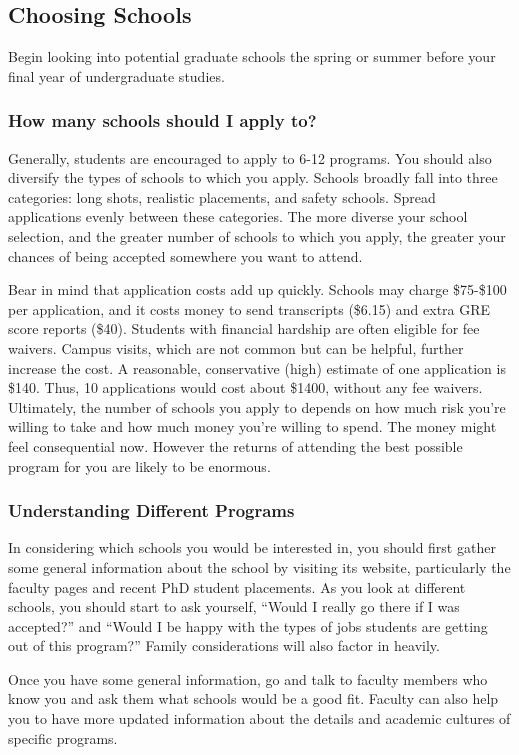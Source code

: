\documentclass[11pt]{article}
\begin{document}
\subsection{Choosing Schools}
Begin looking into potential graduate schools the spring or summer before your final year of undergraduate studies.

\subsubsection*{How many schools should I apply to?}
Generally, students are encouraged to apply to 6-12 programs. You should also diversify the types of schools to which you apply. Schools broadly fall into three categories: long shots, realistic placements, and safety schools. Spread applications evenly between these categories. The more diverse your school selection, and the greater number of schools to which you apply, the greater your chances of being accepted somewhere you want to attend.

Bear in mind that application costs add up quickly. Schools may charge \$75-\$100 per application, and it costs money to send transcripts (\$6.15) and extra GRE score reports (\$40). Students with financial hardship are often eligible for fee waivers. Campus visits, which are not common but can be helpful, further increase the cost. A reasonable, conservative (high) estimate of one application is \$140. Thus, 10 applications would cost about \$1400, without any fee waivers. Ultimately, the number of schools you apply to depends on how much risk you’re willing to take and how much money you’re willing to spend. The money might feel consequential now. However the returns of attending the best possible program for you are likely to be enormous.

\subsubsection*{Understanding Different Programs}
In considering which schools you would be interested in, you should first gather some general information about the school by visiting its website, particularly the faculty pages and recent PhD student placements. As you look at different schools, you should start to ask yourself, “Would I really go there if I was accepted?” and “Would I be happy with the types of jobs students are getting out of this program?” Family considerations will also factor in heavily. 

Once you have some general information, go and talk to faculty members who know you and ask them what schools would be a good fit. Faculty can also help you to have more updated information about the details and academic cultures of specific programs.
\end{document}
